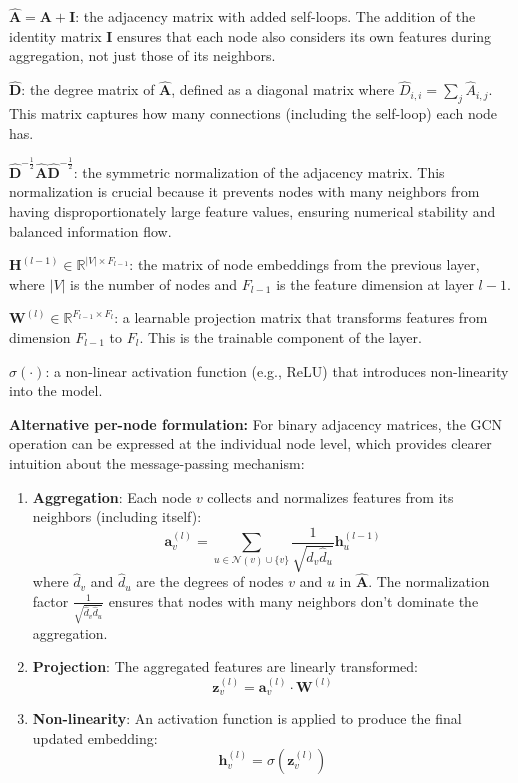 \begin{compactitemize}
\item $\hat{\mathbf{A}} = \mathbf{A} + \mathbf{I}$: the adjacency matrix with added self-loops. The addition of the identity matrix $\mathbf{I}$ ensures that each node also considers its own features during aggregation, not just those of its neighbors.

\item $\hat{\mathbf{D}}$: the degree matrix of $\hat{\mathbf{A}}$, defined as a diagonal matrix where $\hat{D}_{i,i} = \sum_j \hat{A}_{i,j}$. This matrix captures how many connections (including the self-loop) each node has.

\item $\hat{\mathbf{D}}^{-\frac{1}{2}} \hat{\mathbf{A}} \hat{\mathbf{D}}^{-\frac{1}{2}}$: the symmetric normalization of the adjacency matrix. This normalization is crucial because it prevents nodes with many neighbors from having disproportionately large feature values, ensuring numerical stability and balanced information flow.

\item $\mathbf{H}^{(l-1)} \in \mathbb{R}^{|V| \times F_{l-1}}$: the matrix of node embeddings from the previous layer, where $|V|$ is the number of nodes and $F_{l-1}$ is the feature dimension at layer $l-1$.

\item $\mathbf{W}^{(l)} \in \mathbb{R}^{F_{l-1} \times F_l}$: a learnable projection matrix that transforms features from dimension $F_{l-1}$ to $F_l$. This is the trainable component of the layer.

\item $\sigma(\cdot)$: a non-linear activation function (e.g., ReLU) that introduces non-linearity into the model.
\end{compactitemize}

\textbf{Alternative per-node formulation:} For binary adjacency matrices, the GCN operation can be expressed at the individual node level, which provides clearer intuition about the message-passing mechanism:

\begin{enumerate}
\item \textbf{Aggregation}: Each node $v$ collects and normalizes features from its neighbors (including itself):
$$\mathbf{a}_v^{(l)} = \sum_{u \in \mathcal{N}(v) \cup \{v\}} \frac{1}{\sqrt{\hat{d}_v \hat{d}_u}} \mathbf{h}_u^{(l-1)}$$
where $\hat{d}_v$ and $\hat{d}_u$ are the degrees of nodes $v$ and $u$ in $\hat{\mathbf{A}}$. The normalization factor $\frac{1}{\sqrt{\hat{d}_v \hat{d}_u}}$ ensures that nodes with many neighbors don't dominate the aggregation.

\item \textbf{Projection}: The aggregated features are linearly transformed:
$$\mathbf{z}_v^{(l)} = \mathbf{a}_v^{(l)} \cdot \mathbf{W}^{(l)}$$

\item \textbf{Non-linearity}: An activation function is applied to produce the final updated embedding:
$$\mathbf{h}_v^{(l)} = \sigma(\mathbf{z}_v^{(l)})$$
\end{enumerate}

